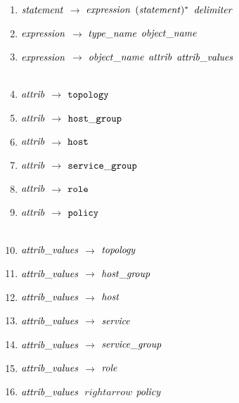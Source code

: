 \begin{enumerate}
 \item \noindent ${\it statement}$ $\rightarrow$ ${\it expression}$ $({\it statement})^{*}$ ${\it delimiter}$ \\ 
  \item ${\it expression}$ $\rightarrow$ ${\it type\_name}$ ${\it object\_name}$ \\ 
  \item ${\it expression}$ $\rightarrow$ ${\it object\_name}$ ${\it attrib}$ ${\it attrib\_values}$ \\\\ 
  
\item \noindent ${\it attrib}$ $\rightarrow$ ${\tt topology}$ \\ 
\item ${\it attrib}$ $\rightarrow$ ${\tt host\_group}$ \\
 \item ${\it attrib}$ $\rightarrow$ ${\tt host}$ \\ 
\item ${\it attrib}$ $\rightarrow$ ${\tt service\_group}$ \\ 
\item ${\it attrib}$ $\rightarrow$ ${\tt role}$ \\ 
\item ${\it attrib}$ $\rightarrow$ ${\tt policy}$ \\\\ 


\item \noindent ${\it attrib\_values}$ $\rightarrow$ ${\it topology}$ \\ 
\item ${\it attrib\_values}$ $\rightarrow$ ${\it host\_group}$ \\ 
\item ${\it attrib\_values}$ $\rightarrow$ ${\it host}$ \\ 
\item ${\it attrib\_values}$ $\rightarrow$ ${\it service}$ \\ 
\item ${\it attrib\_values}$ $\rightarrow$ ${\it service\_group}$ \\ 
\item ${\it attrib\_values}$ $\rightarrow$ ${\it role}$ \\ 
\item ${\it attrib\_values}$ $\ rightarrow$ ${\it policy}$ \\\\ 


\end{enumerate}
